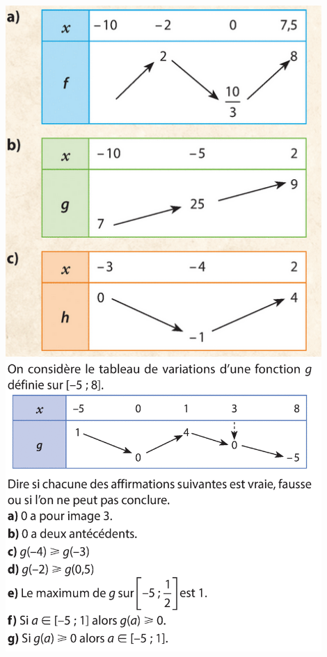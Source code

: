 \documentclass{exam}
\begin{document}
\begin{minipage}{0.45\textwidth}
\begin{questions}
\vspace*{0.2cm}
\includegraphics[width=0.9\textwidth]{Exo2.png}
\question
\includegraphics[width=0.9\textwidth]{Exo5.png}
\end{questions}
\end{minipage}
\hfill
\end{document}
